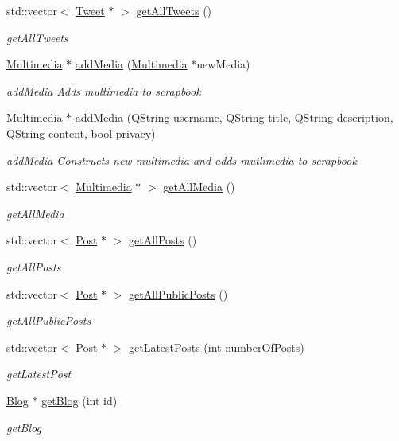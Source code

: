 \begin{DoxyCompactItemize}
std\+::vector$<$ \hyperlink{classTweet}{Tweet} $\ast$ $>$ \hyperlink{classScrapbook_af36d5a699b15569ec45443b5c12a6361}{get\+All\+Tweets} ()
\begin{DoxyCompactList}\small\item\em get\+All\+Tweets \end{DoxyCompactList}\item 
\hyperlink{classMultimedia}{Multimedia} $\ast$ \hyperlink{classScrapbook_ad49877eed315201e91b08198f590f7b5}{add\+Media} (\hyperlink{classMultimedia}{Multimedia} $\ast$new\+Media)
\begin{DoxyCompactList}\small\item\em add\+Media Adds multimedia to scrapbook \end{DoxyCompactList}\item 
\hyperlink{classMultimedia}{Multimedia} $\ast$ \hyperlink{classScrapbook_a45a911b3655b0dc13585391d3d7ad1b1}{add\+Media} (Q\+String username, Q\+String title, Q\+String description, Q\+String content, bool privacy)
\begin{DoxyCompactList}\small\item\em add\+Media Constructs new multimedia and adds mutlimedia to scrapbook \end{DoxyCompactList}\item 
std\+::vector$<$ \hyperlink{classMultimedia}{Multimedia} $\ast$ $>$ \hyperlink{classScrapbook_a1abac6c1797346ebfb91b464b7cebd30}{get\+All\+Media} ()
\begin{DoxyCompactList}\small\item\em get\+All\+Media \end{DoxyCompactList}\item 
std\+::vector$<$ \hyperlink{classPost}{Post} $\ast$ $>$ \hyperlink{classScrapbook_ab28df3465cc12fde8d79a2e84f6b363f}{get\+All\+Posts} ()
\begin{DoxyCompactList}\small\item\em get\+All\+Posts \end{DoxyCompactList}\item 
std\+::vector$<$ \hyperlink{classPost}{Post} $\ast$ $>$ \hyperlink{classScrapbook_ab19322d97d35fca461ba921c24e206cf}{get\+All\+Public\+Posts} ()
\begin{DoxyCompactList}\small\item\em get\+All\+Public\+Posts \end{DoxyCompactList}\item 
std\+::vector$<$ \hyperlink{classPost}{Post} $\ast$ $>$ \hyperlink{classScrapbook_a4d4b3cb9d9a7c2753ce7888f4796bfce}{get\+Latest\+Posts} (int number\+Of\+Posts)
\begin{DoxyCompactList}\small\item\em get\+Latest\+Post \end{DoxyCompactList}\item 
\hyperlink{classBlog}{Blog} $\ast$ \hyperlink{classScrapbook_a4ac2f26d09104e86a4eeb1b5416b4715}{get\+Blog} (int id)
\begin{DoxyCompactList}\small\item\em get\+Blog \end{DoxyCompactList}\end{DoxyCompactItemize}


